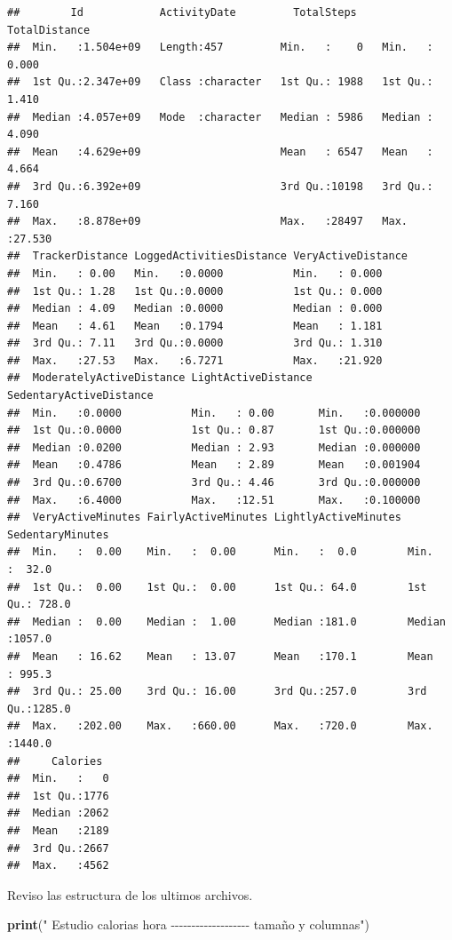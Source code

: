 \documentclass[
]{article}
\newenvironment{Shaded}{\begin{snugshade}}{\end{snugshade}}
\newcommand{\FunctionTok}[1]{\textcolor[rgb]{0.13,0.29,0.53}{\textbf{#1}}}
\newcommand{\NormalTok}[1]{#1}
\newcommand{\StringTok}[1]{\textcolor[rgb]{0.31,0.60,0.02}{#1}}
\begin{document}
\begin{verbatim}
##        Id            ActivityDate         TotalSteps    TotalDistance   
##  Min.   :1.504e+09   Length:457         Min.   :    0   Min.   : 0.000  
##  1st Qu.:2.347e+09   Class :character   1st Qu.: 1988   1st Qu.: 1.410  
##  Median :4.057e+09   Mode  :character   Median : 5986   Median : 4.090  
##  Mean   :4.629e+09                      Mean   : 6547   Mean   : 4.664  
##  3rd Qu.:6.392e+09                      3rd Qu.:10198   3rd Qu.: 7.160  
##  Max.   :8.878e+09                      Max.   :28497   Max.   :27.530  
##  TrackerDistance LoggedActivitiesDistance VeryActiveDistance
##  Min.   : 0.00   Min.   :0.0000           Min.   : 0.000    
##  1st Qu.: 1.28   1st Qu.:0.0000           1st Qu.: 0.000    
##  Median : 4.09   Median :0.0000           Median : 0.000    
##  Mean   : 4.61   Mean   :0.1794           Mean   : 1.181    
##  3rd Qu.: 7.11   3rd Qu.:0.0000           3rd Qu.: 1.310    
##  Max.   :27.53   Max.   :6.7271           Max.   :21.920    
##  ModeratelyActiveDistance LightActiveDistance SedentaryActiveDistance
##  Min.   :0.0000           Min.   : 0.00       Min.   :0.000000       
##  1st Qu.:0.0000           1st Qu.: 0.87       1st Qu.:0.000000       
##  Median :0.0200           Median : 2.93       Median :0.000000       
##  Mean   :0.4786           Mean   : 2.89       Mean   :0.001904       
##  3rd Qu.:0.6700           3rd Qu.: 4.46       3rd Qu.:0.000000       
##  Max.   :6.4000           Max.   :12.51       Max.   :0.100000       
##  VeryActiveMinutes FairlyActiveMinutes LightlyActiveMinutes SedentaryMinutes
##  Min.   :  0.00    Min.   :  0.00      Min.   :  0.0        Min.   :  32.0  
##  1st Qu.:  0.00    1st Qu.:  0.00      1st Qu.: 64.0        1st Qu.: 728.0  
##  Median :  0.00    Median :  1.00      Median :181.0        Median :1057.0  
##  Mean   : 16.62    Mean   : 13.07      Mean   :170.1        Mean   : 995.3  
##  3rd Qu.: 25.00    3rd Qu.: 16.00      3rd Qu.:257.0        3rd Qu.:1285.0  
##  Max.   :202.00    Max.   :660.00      Max.   :720.0        Max.   :1440.0  
##     Calories   
##  Min.   :   0  
##  1st Qu.:1776  
##  Median :2062  
##  Mean   :2189  
##  3rd Qu.:2667  
##  Max.   :4562
\end{verbatim}

Reviso las estructura de los ultimos archivos.

\begin{Shaded}
\begin{Highlighting}[]
\FunctionTok{print}\NormalTok{(}\StringTok{" Estudio calorias hora {-}{-}{-}{-}{-}{-}{-}{-}{-}{-}{-}{-}{-}{-}{-}{-}{-}{-}{-} tamaño y columnas"}\NormalTok{)}
\end{Highlighting}
\end{Shaded}
\end{document}
